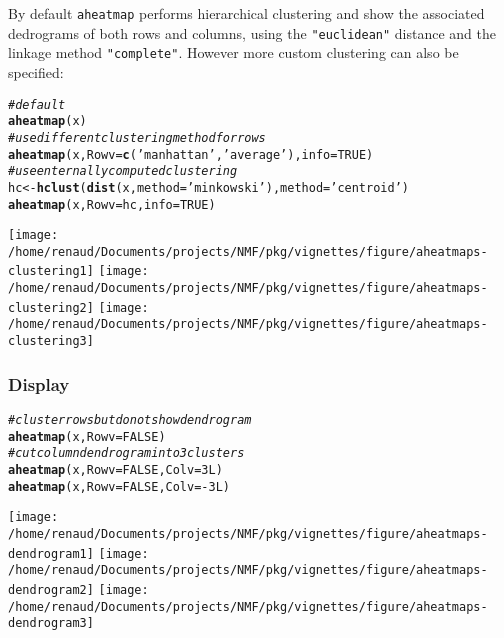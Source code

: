 \documentclass[a4paper]{article}\usepackage[]{graphicx}\usepackage[]{color}
\makeatletter
\newcommand{\hlnum}[1]{\textcolor[rgb]{0.686,0.059,0.569}{#1}}%
\newcommand{\hlstr}[1]{\textcolor[rgb]{0.192,0.494,0.8}{#1}}%
\newcommand{\hlcom}[1]{\textcolor[rgb]{0.678,0.584,0.686}{\textit{#1}}}%
\newcommand{\hlopt}[1]{\textcolor[rgb]{0,0,0}{#1}}%
\newcommand{\hlstd}[1]{\textcolor[rgb]{0.345,0.345,0.345}{#1}}%
\newcommand{\hlkwb}[1]{\textcolor[rgb]{0.69,0.353,0.396}{#1}}%
\newcommand{\hlkwc}[1]{\textcolor[rgb]{0.333,0.667,0.333}{#1}}%
\newcommand{\hlkwd}[1]{\textcolor[rgb]{0.737,0.353,0.396}{\textbf{#1}}}%
\newenvironment{kframe}{%
 \def\at@end@of@kframe{}%
 \ifinner\ifhmode%
  \def\at@end@of@kframe{\end{minipage}}%
  \begin{minipage}{\columnwidth}%
 \fi\fi%
 \def\FrameCommand##1{\hskip\@totalleftmargin \hskip-\fboxsep
 \colorbox{shadecolor}{##1}\hskip-\fboxsep
     \hskip-\linewidth \hskip-\@totalleftmargin \hskip\columnwidth}%
 \MakeFramed {\advance\hsize-\width
   \@totalleftmargin\z@ \linewidth\hsize
   \@setminipage}}%
 {\par\unskip\endMakeFramed%
 \at@end@of@kframe}
\newenvironment{knitrout}{}{} %
\let\code=\texttt
\makeatother
\begin{document}
By default \code{aheatmap} performs hierarchical clustering and show the
associated dedrograms of both rows and columns, using the \code{"euclidean"}
distance and the linkage method \code{"complete"}.
However more custom clustering can also be specified:

\begin{knitrout}\small
{}\color{fgcolor}\begin{kframe}
\begin{alltt}
\hlcom{# default}
\hlkwd{aheatmap}\hlstd{(x)}
\hlcom{# use different clustering method for rows}
\hlkwd{aheatmap}\hlstd{(x,} \hlkwc{Rowv} \hlstd{=} \hlkwd{c}\hlstd{(}\hlstr{'manhattan'}\hlstd{,} \hlstr{'average'}\hlstd{),} \hlkwc{info} \hlstd{=} \hlnum{TRUE}\hlstd{)}
\hlcom{# use enternally computed clustering}
\hlstd{hc} \hlkwb{<-} \hlkwd{hclust}\hlstd{(}\hlkwd{dist}\hlstd{(x,} \hlkwc{method} \hlstd{=} \hlstr{'minkowski'}\hlstd{),} \hlkwc{method} \hlstd{=} \hlstr{'centroid'}\hlstd{)}
\hlkwd{aheatmap}\hlstd{(x,} \hlkwc{Rowv} \hlstd{= hc,} \hlkwc{info} \hlstd{=} \hlnum{TRUE}\hlstd{)}
\end{alltt}
\end{kframe}
\texttt{[image: /home/renaud/Documents/projects/NMF/pkg/vignettes/figure/aheatmaps-clustering1]} 
\texttt{[image: /home/renaud/Documents/projects/NMF/pkg/vignettes/figure/aheatmaps-clustering2]} 
\texttt{[image: /home/renaud/Documents/projects/NMF/pkg/vignettes/figure/aheatmaps-clustering3]} 

\end{knitrout}

\subsubsection{Display}

\begin{knitrout}\small
{}\color{fgcolor}\begin{kframe}
\begin{alltt}
\hlcom{# cluster rows but do not show dendrogram}
\hlkwd{aheatmap}\hlstd{(x,} \hlkwc{Rowv} \hlstd{=} \hlnum{FALSE}\hlstd{)}
\hlcom{# cut column dendrogram into 3 clusters}
\hlkwd{aheatmap}\hlstd{(x,} \hlkwc{Rowv} \hlstd{=} \hlnum{FALSE}\hlstd{,} \hlkwc{Colv} \hlstd{=} \hlnum{3L}\hlstd{)}
\hlkwd{aheatmap}\hlstd{(x,} \hlkwc{Rowv} \hlstd{=} \hlnum{FALSE}\hlstd{,} \hlkwc{Colv} \hlstd{=} \hlopt{-}\hlnum{3L}\hlstd{)}
\end{alltt}
\end{kframe}
\texttt{[image: /home/renaud/Documents/projects/NMF/pkg/vignettes/figure/aheatmaps-dendrogram1]} 
\texttt{[image: /home/renaud/Documents/projects/NMF/pkg/vignettes/figure/aheatmaps-dendrogram2]} 
\texttt{[image: /home/renaud/Documents/projects/NMF/pkg/vignettes/figure/aheatmaps-dendrogram3]} 

\end{knitrout}
\end{document}
